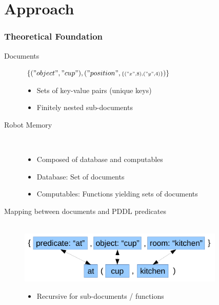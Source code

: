 \section{Approach}
\begin{frame}
  \frametitle{Theoretical Foundation}
  \begin{description}
  \item[Documents] \hfill {\small $\{("object","cup"),("position",{\scriptstyle\{("x",8),("y",4)\}})\}$}\\
    \begin{itemize}
    \item Sets of key-value pairs (unique keys)
    \item Finitely nested sub-documents
    \end{itemize}
  \item[Robot Memory] \hfill \\
    \begin{itemize}
    \item Composed of database and computables
    \item Database: Set of documents
    \item Computables: Functions yielding sets of documents
    \end{itemize}
  \item[Mapping between documents and PDDL predicates] \hfill \\
  \includegraphics[width=0.8\textwidth]{../thesis/draw/mapping.pdf}
    \begin{itemize}
    \item Recursive for sub-documents / functions
    \end{itemize}
  \end{description}  
\end{frame}

